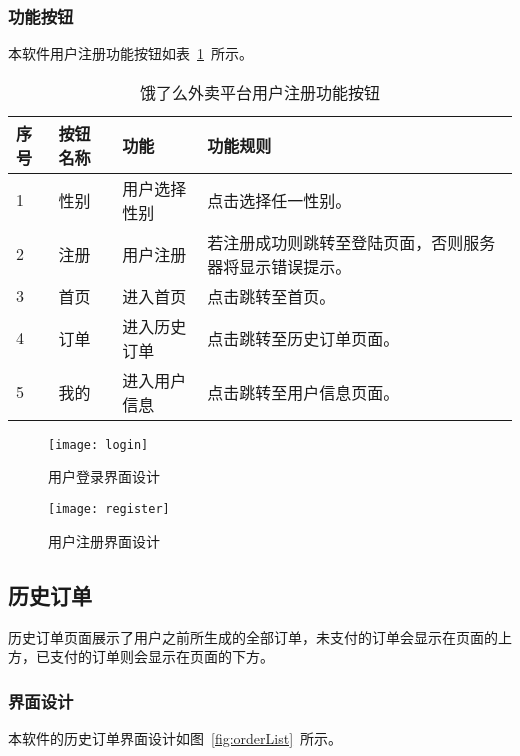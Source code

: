 \subsubsection{功能按钮}
本软件用户注册功能按钮如表~\ref{tab:table8}~所示。
\begin{table}[htbp]
    \caption{饿了么外卖平台用户注册功能按钮}\label{tab:table8}
    \vspace{0.5em}\wuhao
    \begin{tabularx}{\textwidth}{lllX}
    \toprule[1.5pt]
    序号 & 按钮名称 & 功能 & 功能规则 \\ 
    \midrule[1pt]
    1 & 性别 & 用户选择性别 & 点击选择任一性别。 \\
    2 & 注册 & 用户注册 & 若注册成功则跳转至登陆页面，否则服务器将显示错误提示。 \\
    3 & 首页 & 进入首页 & 点击跳转至首页。 \\
    4 & 订单 & 进入历史订单 & 点击跳转至历史订单页面。 \\
    5 & 我的 & 进入用户信息 & 点击跳转至用户信息页面。 \\
\bottomrule[1.5pt]
\end{tabularx}
\vspace{\baselineskip}
\end{table}
\begin{figure}[htbp]
    \centering
    \begin{minipage}{0.4\textwidth}
    \centering
    \texttt{[image: login]}
    \caption{用户登录界面设计}\label{fig:login}
    \end{minipage}
    \begin{minipage}{0.4\textwidth}
    \centering
    \texttt{[image: register]}
    \caption{用户注册界面设计}\label{fig:register}
    \end{minipage}
    \vspace{\baselineskip}
\end{figure}

\subsection{历史订单}
历史订单页面展示了用户之前所生成的全部订单，未支付的订单会显示在页面的上方，已支付的订单则会显示在页面的下方。
\subsubsection{界面设计}
本软件的历史订单界面设计如图~\ref{fig:orderList}~所示。
